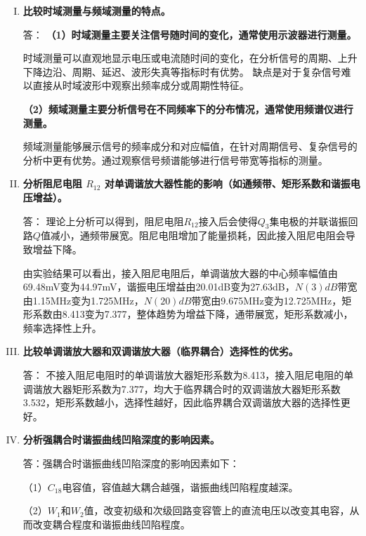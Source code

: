 \documentclass[UTF8]{ctexart}
\begin{document}
\begin{enumerate}[I.]
    \item \textbf{比较时域测量与频域测量的特点。}
    
    答：
    \textbf{（1）时域测量主要关注信号随时间的变化，通常使用示波器进行测量。}

    时域测量可以直观地显示电压或电流随时间的变化，在分析信号的周期、上升下降边沿、周期、延迟、波形失真等指标时有优势。
    缺点是对于复杂信号难以直接从时域波形中观察出频率成分或周期性特征。
   
    \textbf{（2）频域测量主要分析信号在不同频率下的分布情况，通常使用频谱仪进行测量。}
    
    频域测量能够展示信号的频率成分和对应幅值，在针对周期信号、复杂信号的分析中更有优势。通过观察信号频谱能够进行信号带宽等指标的测量。
    
    \item \textbf{分析阻尼电阻 $R_{12}$ 对单调谐放大器性能的影响（如通频带、矩形系数和谐振电压增益）。}

    答：
    理论上分析可以得到，阻尼电阻$R_12$接入后会使得$Q_3$集电极的并联谐振回路$Q$值减小，通频带展宽。阻尼电阻增加了能量损耗，因此接入阻尼电阻会导致增益下降。
    
    由实验结果可以看出，接入阻尼电阻后，单调谐放大器的中心频率幅值由69.48mV变为44.97mV，谐振电压增益由20.01dB变为27.63dB，$N(3)dB$带宽由1.15MHz变为1.725MHz，$N(20)dB$带宽由9.675MHz变为12.725MHz，矩形系数由8.413变为7.377，整体趋势为增益下降，通带展宽，矩形系数减小，频率选择性上升。

    \item \textbf{比较单调谐放大器和双调谐放大器（临界耦合）选择性的优劣。}
    
    答：
    不接入阻尼电阻时的单调谐放大器矩形系数为8.413，接入阻尼电阻的单调谐放大器矩形系数为7.377，均大于临界耦合时的双调谐放大器矩形系数3.532，矩形系数越小，选择性越好，因此临界耦合双调谐放大器的选择性更好。

    \item \textbf{分析强耦合时谐振曲线凹陷深度的影响因素。}

    答：强耦合时谐振曲线凹陷深度的影响因素如下：

    （1）$C_{18}$电容值，容值越大耦合越强，谐振曲线凹陷程度越深。
    
    （2）$W_1$和$W_2$值，改变初级和次级回路变容管上的直流电压以改变其电容，从而改变耦合程度和谐振曲线凹陷程度。
\end{enumerate}
\end{document}
